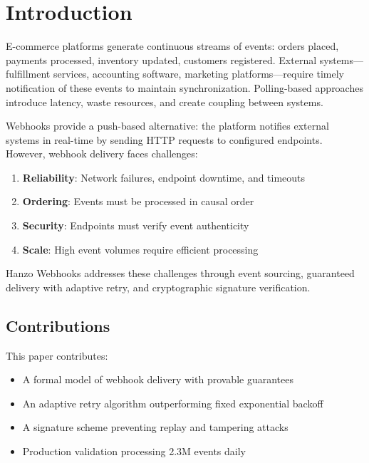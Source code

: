 \section{Introduction}


E-commerce platforms generate continuous streams of events: orders placed, payments processed, inventory updated, customers registered. External systems---fulfillment services, accounting software, marketing platforms---require timely notification of these events to maintain synchronization. Polling-based approaches introduce latency, waste resources, and create coupling between systems.

Webhooks provide a push-based alternative: the platform notifies external systems in real-time by sending HTTP requests to configured endpoints. However, webhook delivery faces challenges:

\begin{enumerate}
    \item \textbf{Reliability}: Network failures, endpoint downtime, and timeouts
    \item \textbf{Ordering}: Events must be processed in causal order
    \item \textbf{Security}: Endpoints must verify event authenticity
    \item \textbf{Scale}: High event volumes require efficient processing
\end{enumerate}

Hanzo Webhooks addresses these challenges through event sourcing, guaranteed delivery with adaptive retry, and cryptographic signature verification.

\subsection{Contributions}

This paper contributes:

\begin{itemize}
    \item A formal model of webhook delivery with provable guarantees
    \item An adaptive retry algorithm outperforming fixed exponential backoff
    \item A signature scheme preventing replay and tampering attacks
    \item Production validation processing 2.3M events daily
\end{itemize}

